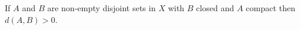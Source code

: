 If $A$ and $B$ are non-empty disjoint sets in $X$ with $B$ closed and $A$ compact then $d(A, B) > 0$.
